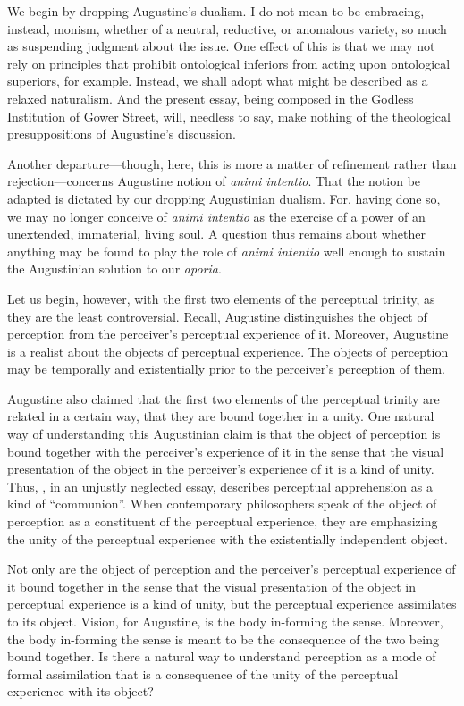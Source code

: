 \documentclass[12pt]{article}
\begin{document}
We begin by dropping Augustine's dualism. I do not mean to be embracing, instead, monism, whether of a neutral, reductive, or anomalous variety, so much as suspending judgment about the issue. One effect of this is that we may not rely on principles that prohibit ontological inferiors from acting upon ontological superiors, for example. Instead, we shall adopt what might be described as a relaxed naturalism. And the present essay, being composed in the Godless Institution of Gower Street, will, needless to say, make nothing of the theological presuppositions of Augustine's discussion.

Another departure---though, here, this is more a matter of refinement rather than rejection---concerns Augustine notion of \emph{animi intentio}. That the notion be adapted is dictated by our dropping Augustinian dualism. For, having done so, we may no longer conceive of \emph{animi intentio} as the exercise of a power of an unextended, immaterial, living soul. A question thus remains about whether anything may be found to play the role of \emph{animi intentio} well enough to sustain the Augustinian solution to our \emph{aporia}.

Let us begin, however, with the first two elements of the perceptual trinity, as they are the least controversial. Recall, Augustine distinguishes the object of perception from the perceiver's perceptual experience of it. Moreover, Augustine is a realist about the objects of perceptual experience. The objects of perception may be temporally and existentially prior to the perceiver's perception of them. 

Augustine also claimed that the first two elements of the perceptual trinity are related in a certain way, that they are bound together in a unity. One natural way of understanding this Augustinian claim is that the object of perception is bound together with the perceiver's experience of it in the sense that the visual presentation of the object in the perceiver's experience of it is a kind of unity. Thus, \citet{Ardley:1958aa}, in an unjustly neglected essay, describes perceptual apprehension as a kind of ``communion''. When contemporary philosophers speak of the object of perception as a constituent of the perceptual experience, they are emphasizing the unity of the perceptual experience with the existentially independent object. 

Not only are the object of perception and the perceiver's perceptual experience of it bound together in the sense that the visual presentation of the object in perceptual experience is a kind of unity, but the perceptual experience assimilates to its object. Vision, for Augustine, is the body in-forming the sense. Moreover, the body in-forming the sense is meant to be the consequence of the two being bound together. Is there a natural way to understand perception as a mode of formal assimilation that is a consequence of the unity of the perceptual experience with its object? 
\end{document}
